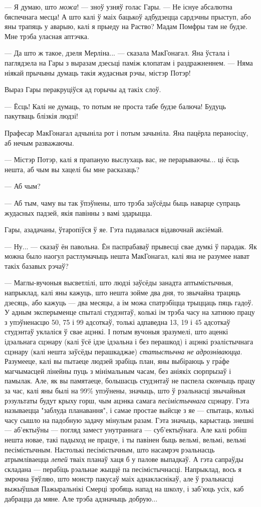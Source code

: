 --- Я думаю, што \emph{можа}! --- зноў узняў голас Гары. --- Не існуе абсалютна
бяспечнага месца! А што калі ў маіх бацькоў адбудзецца сардэчны прыступ, або яны
трапяць у аварыю, калі я прыеду на Раство? Мадам Помфры там не будзе. 
Мне трэба уласная аптэчка. 

--- Да што ж такое, дзеля Мерліна... --- сказала МакГонагал. Яна ўстала і паглядзела
на Гары з выразам дзесьці паміж клопатам і раздражненнем. --- Няма ніякай прычыны
думаць такія жудасныя рэчы, містэр Потэр!

Выраз Гары перакруціўся ад горычы ад такіх слоў.

--- Ёсць! Калі не думаць, то потым не проста табе будзе балюча! Будуць пакутваць 
блізкія людзі!

Прафесар МакГонагал адчыніла рот і потым зачыніла. Яна пацёрла пераносіцу, 
аб нечым разважаючы. 

--- Містэр Потэр, калі я прапаную выслухаць вас, не перарываючы... ці ёсць нешта, 
аб чым вы хацелі бы мне расказаць?

--- Аб чым?

--- Аб тым, чаму вы так ўпэўнены, што трэба заўсёды быць наварце супраць 
жудасных падзей, якія павінны з вамі здарыцца.

Гары, азадачаны, ўтаропіўся ў яе. Гэта падавалася відавочнай аксіёмай.

--- Ну... --- сказаў ён павольна. Ён паспрабаваў прывесці свае думкі ў парадак.
Як можна было наогул растлумачыць нешта МакГонагал, калі яна не разумее нават
такіх базавых рэчаў?

--- Маглы-вучоныя высветлілі, што людзі заўсёды занадта аптымістычныя, напрыклад, 
калі яны 
кажуць, што нешта зойме два дня, то звычайна трацяць дзесяць, або кажуць --- два 
месяцы, а ім можа спатрэбіцца трыццаць пяць гадоў. У адным эксперыменце спыталі 
студэнтаў, колькі ім трэба часу на хатнюю працу з упэўненасцю 50, 75 і 99 адсоткаў,
толькі адпаведна 13, 19 і 45 адсоткаў студэнтаў уклаліся ў свае ацэнкі.
І потым вучоныя зразумелі, што аценкі ідэальнага сцэнару (калі ўсё ідзе
ідэальна і без перашкод) і ацэнкі рэалістычнага 
сцэнару (калі нешта заўсёды перашкаджае) \emph{статыстычна не адрозніваюцца}.
Разумееце, калі вы пытаеце людзей зрабіць план, яны выбіраюць у гр\'афе магчымасцей
лінейны пуць з мінімальным часам, без аніякіх сюрпрызаў і памылак.
Але, як вы памятаеце, большасць студэнтаў не паспела скончыць працу за час, калі
яны былі на 99\% упэўнены, значыць, што ў рэальнасці звычайныя рэзультаты будут 
крыху горш, чым ацэнка самага \emph{песімістычнага} сцэнару.  
Гэта называецца "заблуда планавання", і самае простае выйсце з яе --- спытаць,
колькі часу сышло на падобную задачу мінулым разам. Гэта значыць, карыстаць знешні
--- аб'ектыўны --- погляд замест унутраннага --- суб'ектыўнага. 
Але калі робіш нешта новае, такі падыход не працуе, і ты павінен быць 
вельмі, вельмі, вельмі песімістычным. Настолькі песімістычным, што 
насамрэч рэальнасць атрымліваецца \emph{лепей} тваіх планаў хаця б у палове
выпадкаў.
А гэта сапраўды складана --- перабіць рэальнае жыццё па песімістычнасці. Напрыклад,
вось я змрочна ўяўляю, што монстр пакусаў маіх аднакласнікаў, але ў рэальнасці
выжыўшыя Пажыральнікі Смерці зробяць напад на школу, і заб'юць усіх, каб 
дабрацца да мяне. Але трэба адзначыць добрую...

